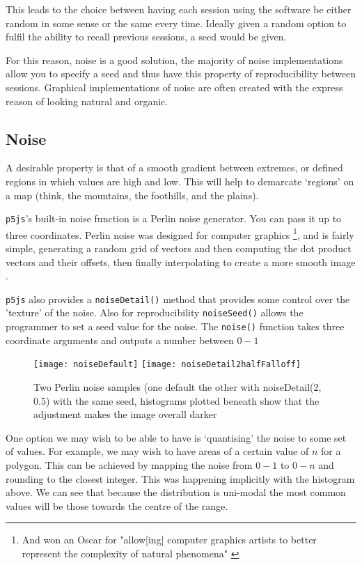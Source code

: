 This leads to the choice between having each session using the software be
either random in some sense or the same every time. Ideally given a random
option to fulfil the ability to recall previous sessions, a seed would be given.

For this reason, noise is a good solution, the majority of noise implementations
allow you to specify a seed and thus have this property of reproducibility
between sessions. Graphical implementations of noise are often created with the
express reason of looking natural and organic.

\subsection{Noise}
A desirable property is that of a smooth gradient between extremes, or
defined regions in which values are high and low. This will help to demarcate
`regions' on a map (think, the mountains, the foothills, and the plains). 

\verb|p5js|'s built-in noise function is a Perlin noise generator. You can pass
it up to three coordinates. Perlin noise was designed for computer graphics
\footnote{And won an Oscar for "allow[ing] computer graphics artists to better
represent the complexity of natural phenomena" \citep{nyu_perlin}}, and is
fairly simple, generating a random grid of vectors and then computing the dot
product vectors and their offsets, then finally interpolating to create a more
smooth image \citep{10.1145/566570.566636}.

\verb|p5js| also provides a \verb|noiseDetail()| method that provides some
control over the 'texture' of the noise. Also for reproducibility
\verb|noiseSeed()| allows the programmer to set a seed value for the noise.
The \verb|noise()| function takes three coordinate arguments and outputs a
number between $0-1$

\begin{figure}[H]
\centering
\texttt{[image: noiseDefault]}
\hspace{0.2cm}
\texttt{[image: noiseDetail2halfFalloff]}
\caption{Two Perlin noise samples (one default the other with
noiseDetail(2, 0.5) with the same seed, histograms plotted beneath show
that the adjustment makes the image overall darker}
\end{figure}

One option we may wish to be able to have is `quantising' the noise to some set
of values. For example, we may wish to have areas of a certain value of $n$ for a
polygon. This can be achieved by mapping the noise from $0-1$ to $0-n$ and
rounding to the closest integer. This was happening implicitly with the
histogram above. We can see that because the distribution is uni-modal the most
common values will be those towards the centre of the range.

